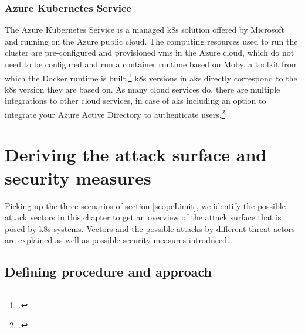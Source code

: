 \subsection{Azure Kubernetes Service}

The Azure Kubernetes Service is a managed \gls{k8s} solution offered by Microsoft and running on the Azure public cloud. 
The computing resources used to run the cluster are pre-configured and provisioned \gls{vm}s in the Azure cloud, which do not need to be configured and run a container runtime based on Moby, a toolkit from which the Docker runtime is built.\footcite[][, section 'What is Moby?']{dockerMoby} 
\gls{k8s} versions in \gls{aks} directly correspond to the \gls{k8s} version they are based on.
As many cloud services do, there are multiple integrations to other cloud services, in case of \gls{aks} including an option to integrate your Azure Active Directory to authenticate users.\footcite[][, first paragraph]{aadAksAuth}


\chapter{Deriving the attack surface and security measures}

Picking up the three scenarios of section \ref{scopeLimit}, we identify the possible attack vectors in this chapter to get an overview of the attack surface that is posed by \gls{k8s} systems. Vectors and the possible attacks by different threat actors are explained as well as possible security measures introduced.

\section{Defining procedure and approach}

